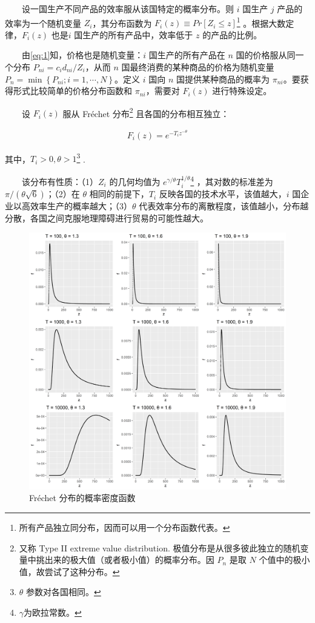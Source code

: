 \documentclass[]{article}
\let\rmarkdownfootnote\footnote%
\def\footnote{\protect\rmarkdownfootnote}
\begin{document}
　　设一国生产不同产品的效率服从该国特定的概率分布。则 \(i\) 国生产 \(j\) 产品的效率为一个随机变量 \(Z_i\)，其分布函数为 \(F_i(z) \equiv Pr[Z_i \le z]\)\footnote{所有产品独立同分布，因而可以用一个分布函数代表。} 。根据大数定律，\(F_i(z)\) 也是\(i\) 国生产的所有产品中，效率低于 \(z\) 的产品的比例。

　　由\eqref{eq:1}知，价格也是随机变量：\(i\) 国生产的所有产品在 \(n\) 国的价格服从同一个分布 \(P_{n i}=c_{i} d_{n i} / Z_{i}\)，从而 \(n\) 国最终消费的某种商品的价格为随机变量 \(P_{n}=\min \left\{P_{n i} ; i=1, \cdots, N\right\}\)。定义 \(i\) 国向 \(n\) 国提供某种商品的概率为 \(\pi_{n i}\)。要获得形式比较简单的价格分布函数和 \(\pi_{n i}\)，需要对 \(F_i(z)\) 进行特殊设定。

　　设 \(F_i(z)\) 服从 Fréchet 分布\footnote{又称 Type II extreme value distribution. 极值分布是从很多彼此独立的随机变量中挑出来的极大值（或者极小值）的概率分布。因 \(P_n\) 是取 \(N\) 个值中的极小值，故尝试了这种分布。} 且各国的分布相互独立：

\begin{align}
F_{i}(z)=e^{-T_{i} z^{-\theta}} \label{eq:4}
\end{align}

其中，\(T_i>0, \theta >1\)\footnote{\(\theta\) 参数对各国相同。} .

　　该分布有性质：（1）\(Z_i\) 的几何均值为 \(e^{\gamma/\theta}T_i^{1/\theta}\)\footnote{\(\gamma\)为欧拉常数。} ，其对数的标准差为 \(\pi/(\theta \sqrt{6})\)；（2）在 \(\theta\) 相同的前提下，\(T_i\) 反映各国的技术水平，该值越大，\(i\) 国企业以高效率生产的概率越大；（3）\(\theta\) 代表效率分布的离散程度，该值越小，分布越分散，各国之间克服地理障碍进行贸易的可能性越大。

\begin{figure}
\centering
\includegraphics{Figures/Frechet.png}
\caption{Fréchet 分布的概率密度函数}
\end{figure}
\end{document}
